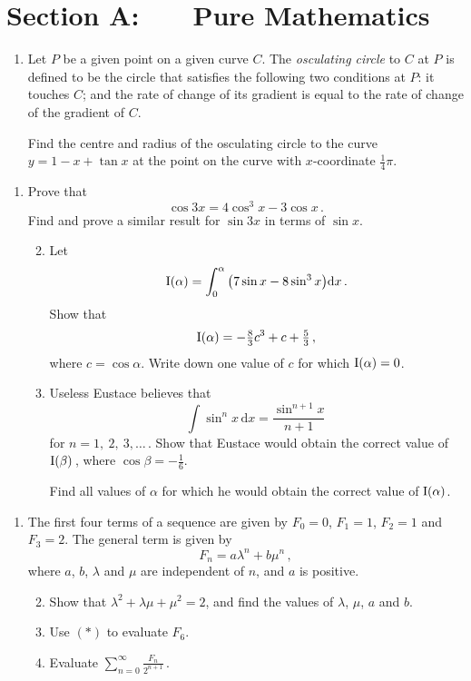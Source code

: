 \documentclass[a4, 11pt]{report}
\newlength{\qspace}
\newcounter{qnumber}
\newenvironment{question}%
 {\vspace{\qspace}
  \begin{enumerate}[\bfseries 1\quad][10]%
    \setcounter{enumi}{\value{qnumber}}%
    \item%
 }
{
  \end{enumerate}
  \filbreak
  \stepcounter{qnumber}
 }
\newenvironment{questionparts}[1][1]%
 {
  \begin{enumerate}[\bfseries (i)]%
    \setcounter{enumii}{#1}
    \addtocounter{enumii}{-1}
    \setlength{\itemsep}{5mm}
    \setlength{\parskip}{8pt}
 }
 {
  \end{enumerate}
 }
\def\d{{\mathrm d}}
\newcommand{\ds}{\displaystyle}
\begin{document}
\setcounter{page}{2}

 
\section*{Section A: \ \ \ Pure Mathematics}

\begin{question}
Let $P$ be a given point on a given curve $C$. The {\em osculating 
circle} to $C$ at $P$
is defined to be the circle that satisfies the following two
conditions at $P$: it touches $C$; and  the rate of change of its gradient 
 is equal to the rate of change of the 
gradient of $C$.

Find the centre and radius of the osculating circle to the curve $y=1-x+\tan x$
at the point on the curve with $x$-coordinate $\frac14 \pi$.
\end{question}

\begin{question}
Prove that 
\[
\cos 3x = 4 \cos^3 x - 3 \cos x \,.
\]
Find  and prove a similar result for $\sin 3x$ in terms of $\sin x$.

\begin{questionparts}
\item Let 
\[
{\rm I}(\alpha) = \int_0^\alpha \big(7\sin x - 8 \sin^3 x\big) \d x\,.
\]
Show that 
\[
{\rm I}(\alpha) = -\tfrac 8 3 c^3 + c +\tfrac5 3\,,
\]
where $c = \cos \alpha$.
Write down one value of $c$ for which ${\rm I}(\alpha) =0$.

\item Useless Eustace believes that 
\[
\int \sin^n x \, \d x =\dfrac {\sin^{n+1}x}{n+1}\,
\]
 for $n=1, \ 2, \ 3,  \ldots\, $. 
Show that 
Eustace would obtain the correct value of ${\rm I}(\beta)\,$, where
$\cos \beta= -\frac16$.

Find 
all values of $\alpha$ for which he
would obtain the correct value of ${\rm I}(\alpha)$.
\end{questionparts}

\end{question}

\begin{question}
The first four terms of a  sequence 
are given by $F_0=0$, $F_1=1$, $F_2=1$ and $F_3=2$. The general term
is given by
\[
F_n= a\lambda^n+b\mu^n\,,
\tag{$*$}
\]
where $a$, $b$, $\lambda$ and $\mu$ are independent of $n$, and $a$ is
positive.

\begin{questionparts}
\item Show that 
$\lambda^2 +\lambda\mu+ \mu^2 = 2$, and find the values of
$\lambda$, $\mu$, $a$ and $b$.
\item Use $(*)$ to evaluate $F_6$.
\item Evaluate
$\ds \sum_{n=0}^\infty \frac{F_n}{2^{n+1}}\,.$
\end{questionparts}
\end{question}
\end{document}
